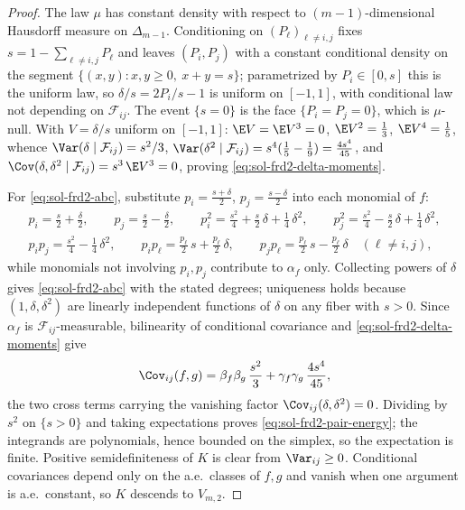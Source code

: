 \documentclass[../main.tex]{subfiles}
\begin{document}
\begin{proof}
The law $\mu$ has constant density with respect to $(m-1)$-dimensional Hausdorff
measure on $\Delta_{m-1}$.  Conditioning on $(P_\ell)_{\ell\ne i,j}$ fixes
$s=1-\sum_{\ell\ne i,j}P_\ell$ and leaves $(P_i,P_j)$ with a constant conditional
density on the segment $\{(x,y):x,y\ge0,\ x+y=s\}$; parametrized by
$P_i\in[0,s]$ this is the uniform law, so $\delta/s=2P_i/s-1$ is uniform on $[-1,1]$,
with conditional law not depending on $\mathcal F_{ij}$.  The event $\{s=0\}$ is the
face $\{P_i=P_j=0\}$, which is $\mu$-null.  With $V=\delta/s$ uniform on $[-1,1]$:
$\E V=\E V^3=0$, $\E V^2=\tfrac13$, $\E V^4=\tfrac15$, whence
$\Var(\delta\mid\mathcal F_{ij})=s^2/3$,
$\Var(\delta^2\mid\mathcal F_{ij})=s^4(\tfrac15-\tfrac19)=\tfrac{4s^4}{45}$, and
$\Cov(\delta,\delta^2\mid\mathcal F_{ij})=s^3\,\E V^3=0$, proving
\eqref{eq:sol-frd2-delta-moments}.

For \eqref{eq:sol-frd2-abc}, substitute
$p_i=\tfrac{s+\delta}2$, $p_j=\tfrac{s-\delta}2$ into each monomial of $f$:
\begin{equation}
\begin{gathered}
  p_i=\tfrac s2+\tfrac\delta2,\qquad
  p_j=\tfrac s2-\tfrac\delta2,\qquad
  p_i^2=\tfrac{s^2}4+\tfrac s2\,\delta+\tfrac14\,\delta^2,\qquad
  p_j^2=\tfrac{s^2}4-\tfrac s2\,\delta+\tfrac14\,\delta^2,\\
  p_ip_j=\tfrac{s^2}4-\tfrac14\,\delta^2,\qquad
  p_ip_\ell=\tfrac{p_\ell}2\,s+\tfrac{p_\ell}2\,\delta,\qquad
  p_jp_\ell=\tfrac{p_\ell}2\,s-\tfrac{p_\ell}2\,\delta
  \quad(\ell\ne i,j),
\end{gathered}
  \label{eq:sol-frd2-substitution-table}
\end{equation}
while monomials not involving $p_i,p_j$ contribute to $\alpha_f$ only.  Collecting
powers of $\delta$ gives \eqref{eq:sol-frd2-abc} with the stated degrees; uniqueness
holds because $(1,\delta,\delta^2)$ are linearly independent functions of $\delta$ on
any fiber with $s>0$.  Since $\alpha_f$ is $\mathcal F_{ij}$-measurable, bilinearity
of conditional covariance and \eqref{eq:sol-frd2-delta-moments} give
\[
  \Cov_{ij}(f,g)
  =\beta_f\beta_g\,\frac{s^2}3+\gamma_f\gamma_g\,\frac{4s^4}{45},
\]
the two cross terms carrying the vanishing factor
$\Cov_{ij}(\delta,\delta^2)=0$.  Dividing by $s^2$ on $\{s>0\}$ and taking
expectations proves \eqref{eq:sol-frd2-pair-energy}; the integrands are polynomials,
hence bounded on the simplex, so the expectation is finite.  Positive semidefiniteness
of $K$ is clear from $\Var_{ij}\ge0$.  Conditional covariances depend only on the
a.e.\ classes of $f,g$ and vanish when one argument is a.e.\ constant, so $K$ descends
to $V_{m,2}$.
\end{proof}
\end{document}
